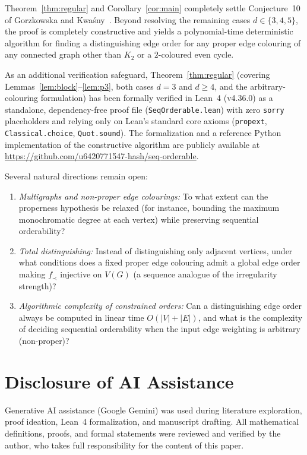 \documentclass[11pt,a4paper]{article}
\begin{document}
Theorem~\ref{thm:regular} and Corollary~\ref{cor:main} completely settle Conjecture~10 of Gorzkowska and Kwa\'sny~\cite{GK2026}. Beyond resolving the remaining cases $d \in \{3, 4, 5\}$, the proof is completely constructive and yields a polynomial-time deterministic algorithm for finding a distinguishing edge order for any proper edge colouring of any connected graph other than $K_2$ or a $2$-coloured even cycle.

As an additional verification safeguard, Theorem~\ref{thm:regular} (covering Lemmas~\ref{lem:block}--\ref{lem:p3}, both cases $d = 3$ and $d \ge 4$, and the arbitrary-colouring formulation) has been formally verified in Lean~4 (v4.36.0) as a standalone, dependency-free proof file (\texttt{SeqOrderable.lean}) with zero \texttt{sorry} placeholders and relying only on Lean's standard core axioms (\texttt{propext}, \texttt{Classical.choice}, \texttt{Quot.sound}). The formalization and a reference Python implementation of the constructive algorithm are publicly available at \url{https://github.com/u6420771547-hash/seq-orderable}.

Several natural directions remain open:
\begin{enumerate}
  \item \emph{Multigraphs and non-proper edge colourings:} To what extent can the properness hypothesis be relaxed (for instance, bounding the maximum monochromatic degree at each vertex) while preserving sequential orderability?
  \item \emph{Total distinguishing:} Instead of distinguishing only adjacent vertices, under what conditions does a fixed proper edge colouring admit a global edge order making $f_\prec$ injective on $V(G)$ (a sequence analogue of the irregularity strength)?
  \item \emph{Algorithmic complexity of constrained orders:} Can a distinguishing edge order always be computed in linear time $O(|V| + |E|)$, and what is the complexity of deciding sequential orderability when the input edge weighting is arbitrary (non-proper)?
\end{enumerate}

\section*{Disclosure of AI Assistance}

Generative AI assistance (Google Gemini) was used during literature exploration, proof ideation, Lean~4 formalization, and manuscript drafting. All mathematical definitions, proofs, and formal statements were reviewed and verified by the author, who takes full responsibility for the content of this paper.
\end{document}
